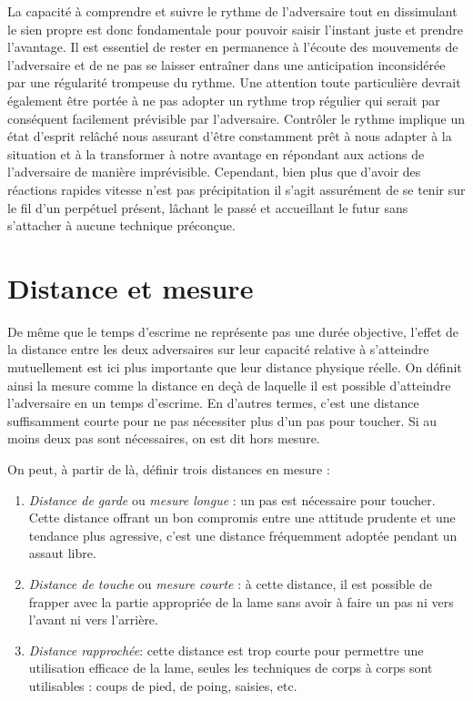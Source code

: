 La capacité à comprendre et suivre le rythme de l'adversaire tout en dissimulant le sien propre est donc fondamentale pour pouvoir saisir l'instant juste et prendre l'avantage.
Il est essentiel de rester en permanence à l'écoute des mouvements de l'adversaire et de ne pas se laisser entraîner dans une anticipation inconsidérée par une régularité trompeuse du rythme.
Une attention toute particulière devrait également être portée à ne pas adopter un rythme trop régulier qui serait par conséquent facilement prévisible par l'adversaire.
Contrôler le rythme implique un état d'esprit relâché nous assurant d'être constamment prêt à nous adapter à la situation et à la transformer à notre avantage en répondant aux actions de l'adversaire de manière imprévisible.
Cependant, bien plus que d'avoir des réactions rapides  \textemdash{} vitesse n'est pas précipitation \textemdash{} il s'agit assurément de se tenir sur le fil d'un perpétuel présent, lâchant le passé et accueillant le futur sans s'attacher à aucune technique préconçue.

\section{Distance et mesure}
De même que le temps d'escrime ne représente pas une durée objective, l'effet de la distance entre les deux adversaires sur leur capacité relative à s'atteindre mutuellement est ici plus importante que leur distance physique réelle.
On définit ainsi la mesure  comme la distance en deçà de laquelle il est possible d'atteindre l'adversaire en un temps d'escrime.
En d'autres termes, c'est une distance suffisamment courte pour ne pas nécessiter plus d'un pas pour toucher.
Si au moins deux pas sont nécessaires, on est dit hors mesure.

On peut, à partir de là, définir trois distances en mesure :
\begin{enumerate}
\item \emph{Distance de garde} ou \emph{mesure longue} : 
un pas est nécessaire pour toucher. Cette distance offrant un bon compromis entre une attitude prudente et une tendance plus agressive, c'est une distance fréquemment adoptée pendant un assaut libre.
\item \emph{Distance de touche} ou \emph{mesure courte} : 
à cette distance, il est possible de frapper avec la partie appropriée de la lame sans avoir à faire un pas ni vers l'avant ni vers l'arrière.
\item \emph{Distance rapprochée}: 
cette distance est trop courte pour permettre une utilisation efficace de la lame, seules les techniques de corps à corps sont utilisables : coups de pied, de poing, saisies, etc. 
\end{enumerate}


